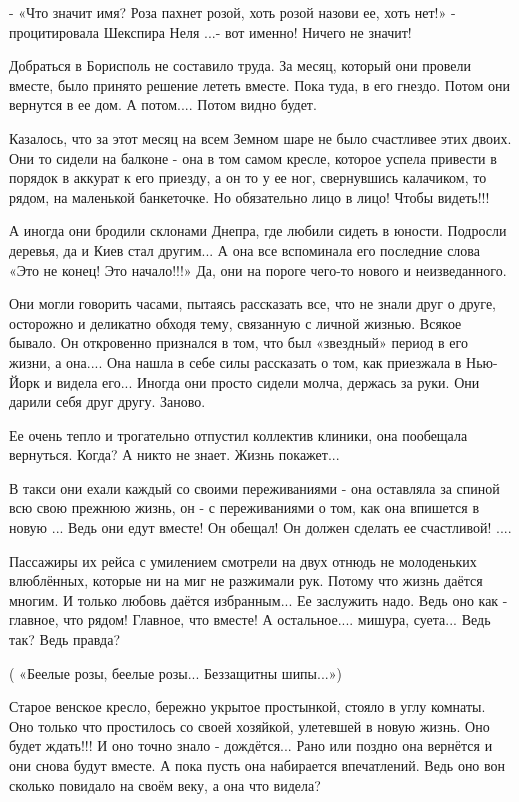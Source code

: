 - «Что значит имя? Роза пахнет розой, хоть розой назови ее, хоть нет!» -
процитировала Шекспира Неля ...- вот именно! Ничего не значит! 

Добраться в Борисполь не составило труда. За месяц, который они провели
вместе, было принято решение лететь вместе. Пока туда, в его гнездо. Потом они
вернутся в ее дом. А потом.... Потом видно будет.

Казалось, что за этот месяц на всем Земном шаре не было счастливее этих
двоих. Они то сидели на балконе - она в том самом кресле, которое успела привести
в порядок в аккурат к его приезду, а он то у ее ног, свернувшись калачиком, то
рядом, на маленькой банкеточке. Но обязательно лицо в лицо! Чтобы видеть!!! 

А иногда они бродили склонами Днепра, где любили сидеть в юности. Подросли
деревья, да и Киев стал другим... А она все вспоминала его последние слова «Это
не конец! Это начало!!!» Да, они на пороге чего-то нового и неизведанного.

Они могли говорить часами, пытаясь рассказать все, что не знали друг о
друге, осторожно и деликатно обходя тему, связанную с личной жизнью. Всякое
бывало. Он откровенно признался в том, что был «звездный» период в его жизни, а
она.... Она нашла в себе силы рассказать о том, как приезжала в Нью-Йорк и видела
его... Иногда они просто сидели молча, держась за руки. Они дарили себя друг
другу. Заново.

Ее очень тепло и трогательно отпустил коллектив клиники, она пообещала
вернуться. Когда? А никто не знает. Жизнь покажет...

В такси они ехали каждый со своими переживаниями - она оставляла за спиной всю
свою прежнюю жизнь, он - с переживаниями о том, как она впишется в новую
... Ведь они едут вместе! Он обещал! Он должен сделать ее счастливой! ....

Пассажиры их рейса с умилением смотрели на двух отнюдь не молоденьких
влюблённых, которые ни на миг не разжимали рук. Потому что жизнь даётся многим. И
только любовь даётся избранным... Ее заслужить надо. Ведь оно как - главное, что
рядом! Главное, что  вместе! А остальное.... мишура, суета... Ведь так? Ведь
правда? 

( «Беелые розы, беелые розы... Беззащитны шипы...»)

Старое венское кресло, бережно укрытое простынкой, стояло в углу комнаты. Оно
только что простилось со своей хозяйкой, улетевшей в новую жизнь. Оно будет
ждать!!! И оно точно знало - дождётся... Рано или поздно она вернётся и они
снова будут вместе. А пока пусть она набирается впечатлений. Ведь оно вон
сколько повидало на своём веку, а она что видела? 

